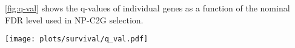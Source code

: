\cref{fig:q-val} shows the q-values of individual genes as a function of the nominal FDR level used in NP-C2G selection.

\begin{figure*}
\centering
\texttt{[image: plots/survival/q\_val.pdf]}
\caption{q-values as a function of nominal FDR level for each gene. Only genes achieving q-value below 0.1 are shown.}
\label{fig:q-val}
\end{figure*}